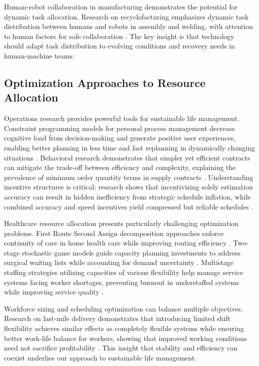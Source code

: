 Human-robot collaboration in manufacturing demonstrates the potential for dynamic task allocation. Research on recyclofacturing emphasizes dynamic task distribution between humans and robots in assembly and welding, with attention to human factors for safe collaboration \citep{SCU2025}. The key insight is that technology should adapt task distribution to evolving conditions and recovery needs in human-machine teams.

\subsection{Optimization Approaches to Resource Allocation}

Operations research provides powerful tools for sustainable life management. Constraint programming models for personal process management decrease cognitive load from decision-making and generate positive user experiences, enabling better planning in less time and fast replanning in dynamically changing situations \citep{oruç_constraint_2022}. Behavioral research demonstrates that simpler yet efficient contracts can mitigate the trade-off between efficiency and complexity, explaining the prevalence of minimum order quantity terms in supply contracts \citep{tuncel_why_2022}. Understanding incentive structures is critical: research shows that incentivizing solely estimation accuracy can result in hidden inefficiency from strategic schedule inflation, while combined accuracy and speed incentives yield compressed but reliable schedules \citep{lorko_hidden_2023}.

Healthcare resource allocation presents particularly challenging optimization problems. First Route Second Assign decomposition approaches enforce continuity of care in home health care while improving routing efficiency \citep{lahrichi_first_2022}. Two-stage stochastic game models guide capacity planning investments to address surgical waiting lists while accounting for demand uncertainty \citep{acuna_two_2024}. Multistage staffing strategies utilizing capacities of various flexibility help manage service systems facing worker shortages, preventing burnout in understaffed systems while improving service quality \citep{yuan_managing_2025}.

Workforce sizing and scheduling optimization can balance multiple objectives. Research on last-mile delivery demonstrates that introducing limited shift flexibility achieves similar effects as completely flexible systems while ensuring better work-life balance for workers, showing that improved working conditions need not sacrifice profitability \citep{mandal_tactical_2025}. This insight that stability and efficiency can coexist underlies our approach to sustainable life management.

